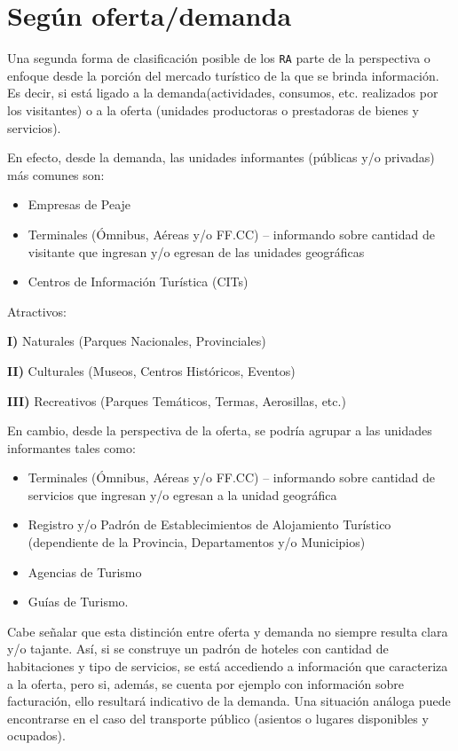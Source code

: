 \documentclass[
]{book}
\begin{document}
\hypertarget{seguxfan-ofertademanda}{%
\section{Según oferta/demanda}\label{seguxfan-ofertademanda}}

Una segunda forma de clasificación posible de los \texttt{RA} parte de la perspectiva o enfoque desde la porción del mercado turístico de la que se brinda información. Es decir, si está ligado a la demanda(actividades, consumos, etc. realizados por los visitantes) o a la oferta (unidades productoras o prestadoras de bienes y servicios).

En efecto, desde la demanda, las unidades informantes (públicas y/o privadas) más comunes son:

\begin{itemize}
\item
  Empresas de Peaje
\item
  Terminales (Ómnibus, Aéreas y/o FF.CC) -- informando sobre cantidad de visitante que ingresan y/o egresan de las unidades geográficas
\item
  Centros de Información Turística (CITs)
\end{itemize}

Atractivos:

\textbf{I)} Naturales (Parques Nacionales, Provinciales)

\textbf{II)} Culturales (Museos, Centros Históricos, Eventos)

\textbf{III)} Recreativos (Parques Temáticos, Termas, Aerosillas, etc.)

En cambio, desde la perspectiva de la oferta, se podría agrupar a las unidades informantes tales como:

\begin{itemize}
\item
  Terminales (Ómnibus, Aéreas y/o FF.CC) -- informando sobre cantidad de servicios que ingresan y/o egresan a la unidad geográfica
\item
  Registro y/o Padrón de Establecimientos de Alojamiento Turístico (dependiente de la Provincia, Departamentos y/o Municipios)
\item
  Agencias de Turismo
\item
  Guías de Turismo.
\end{itemize}

Cabe señalar que esta distinción entre oferta y demanda no siempre resulta clara y/o tajante. Así, si se construye un padrón de hoteles con cantidad de habitaciones y tipo de servicios, se está accediendo a información que caracteriza a la oferta, pero si, además, se cuenta por ejemplo con información sobre facturación, ello resultará indicativo de la demanda. Una situación análoga puede encontrarse en el caso del transporte público (asientos o lugares disponibles y ocupados).
\end{document}
